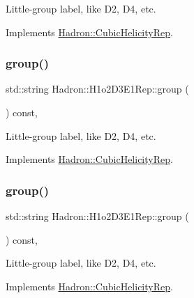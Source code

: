 Little-\/group label, like D2, D4, etc. 

Implements \mbox{\hyperlink{structHadron_1_1CubicHelicityRep_a101a7d76cd8ccdad0f272db44b766113}{Hadron\+::\+Cubic\+Helicity\+Rep}}.

\mbox{\label{structHadron_1_1H1o2D3E1Rep_a6c9218517ca2797e0d5ee7e92887a916}} 
\subsubsection{\texorpdfstring{group()}{group()}\hspace{0.1cm}{\footnotesize\ttfamily [3/5]}}
{\footnotesize\ttfamily std\+::string Hadron\+::\+H1o2\+D3\+E1\+Rep\+::group (\begin{DoxyParamCaption}{ }\end{DoxyParamCaption}) const\hspace{0.3cm}{\ttfamily [inline]}, {\ttfamily [virtual]}}

Little-\/group label, like D2, D4, etc. 

Implements \mbox{\hyperlink{structHadron_1_1CubicHelicityRep_a101a7d76cd8ccdad0f272db44b766113}{Hadron\+::\+Cubic\+Helicity\+Rep}}.

\mbox{\label{structHadron_1_1H1o2D3E1Rep_a6c9218517ca2797e0d5ee7e92887a916}} 
\subsubsection{\texorpdfstring{group()}{group()}\hspace{0.1cm}{\footnotesize\ttfamily [4/5]}}
{\footnotesize\ttfamily std\+::string Hadron\+::\+H1o2\+D3\+E1\+Rep\+::group (\begin{DoxyParamCaption}{ }\end{DoxyParamCaption}) const\hspace{0.3cm}{\ttfamily [inline]}, {\ttfamily [virtual]}}

Little-\/group label, like D2, D4, etc. 

Implements \mbox{\hyperlink{structHadron_1_1CubicHelicityRep_a101a7d76cd8ccdad0f272db44b766113}{Hadron\+::\+Cubic\+Helicity\+Rep}}.

